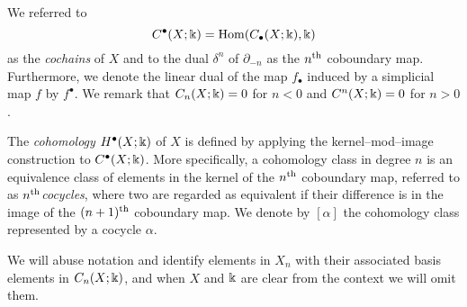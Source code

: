 We referred to
\begin{equation*}
C^\bullet(X; \Bbbk) = \mathrm{Hom}(C_\bullet(X; \Bbbk), \Bbbk)
\end{equation*}
as the \textit{cochains} of $X$ and to the dual $\delta^{n}$ of $\partial_{-n}$ as the $n^\mathrm{th}$ coboundary map.
Furthermore, we denote the linear dual of the map $f_\bullet$ induced by a simplicial map $f$ by $f^\bullet$.
We remark that $C_n(X; \Bbbk) = 0$ for $n < 0$ and $C^n(X;\Bbbk) = 0$ for $n > 0$.

The \textit{cohomology} $H^\bullet(X; \Bbbk)$ of $X$ is defined by applying the kernel--mod--image construction to $C^\bullet(X; \Bbbk)$.
More specifically, a cohomology class in degree $n$ is an equivalence class of elements in the kernel of the $n^\mathrm{th}$ coboundary map, referred to as  $n^\mathrm{th}$\textit{cocycles}, where two are regarded as equivalent if their difference is in the image of the $(n+1)^\mathrm{th}$ coboundary map.
We denote by $[\alpha]$ the cohomology class represented by a cocycle $\alpha$.

We will abuse notation and identify elements in $X_n$ with their associated basis elements in $C_{n}(X; \Bbbk)$, and when $X$ and $\Bbbk$ are clear from the context we will omit them.